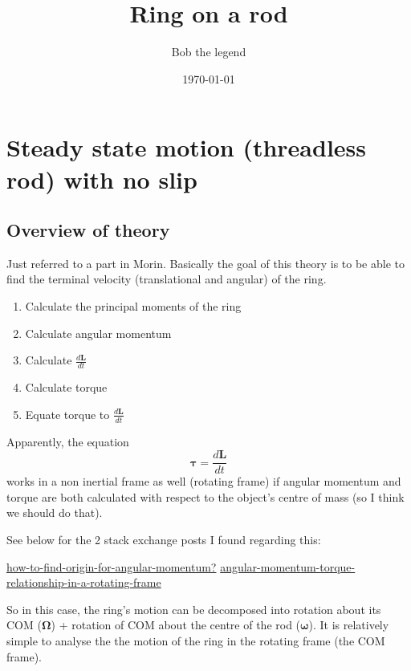 \documentclass{scrartcl}
\begin{document}
\title{Ring on a rod}
\author{Bob the legend}
\date{\today}
\setlength\parindent{0pt}


\maketitle

\section{Steady state motion (threadless rod) with no slip}
\subsection{Overview of theory}
Just referred to a part in Morin. Basically the goal of this theory is to be able to find the terminal velocity (translational and angular) of the ring.

\begin{enumerate}
    \item Calculate the principal moments of the ring
    \item Calculate angular momentum
    \item Calculate $\frac{d\mathbf{L}}{dt}$
    \item Calculate torque
    \item Equate torque  to $\frac{d\mathbf{L}}{dt}$
\end{enumerate}

Apparently, the equation
\begin{equation}
    \mathbf{\tau}=\frac{d\mathbf{L}}{dt}
\end{equation}
works in a non inertial frame as well (rotating frame) if angular momentum and torque are both calculated with respect to the object's centre of mass (so I think we should do that).

See below for the 2 stack exchange posts I found regarding this:
\begin{mybox}
    \href{https://physics.stackexchange.com/questions/559157/how-to-find-origin-for-angular-momentum?rq=1}{how-to-find-origin-for-angular-momentum?}
    \newline
    \href{https://physics.stackexchange.com/questions/176205/angular-momentum-torque-relationship-in-a-rotating-frame}{angular-momentum-torque-relationship-in-a-rotating-frame}
\end{mybox}

So in this case, the ring's motion can be decomposed into rotation about its COM ($\mathbf{\Omega}$) + rotation of COM about the centre of the rod ($\boldsymbol{\omega}$). It is relatively simple to analyse the the motion of the ring in the rotating frame (the COM frame).
\end{document}
